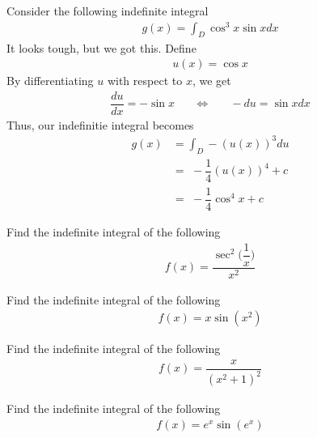 \begin{example}
Consider the following indefinite integral
\begin{align*}
    g(x) = \int_{D} \cos^{3} x \sin x dx
\end{align*}
It looks tough, but we got this. Define
\begin{align*}
    u(x) = \cos x
\end{align*}
By differentiating $u$ with respect to $x$, we get
\begin{align*}
    \dfrac{du}{dx} = -\sin x \hspace{20pt} \Longleftrightarrow \hspace{20pt} -du = \sin x dx
\end{align*}
Thus, our indefinitie integral becomes
\begin{align*}
    g(x) &= \int_{D} -(u(x))^{3} du\\[2ex]
    &= \hspace{4pt} -\dfrac{1}{4} (u(x))^{4} + c\\[2ex]
    &= \hspace{4pt} -\dfrac{1}{4} \cos^{4} x + c
\end{align*}
\end{example}

\begin{exercise}
Find the indefinite integral of the following 
\begin{align*}
    f(x) = \dfrac{\sec^{2} \Big(\dfrac{1}{x}\Big)}{x^{2}}
\end{align*}
\end{exercise}

\begin{exercise}
Find the indefinite integral of the following 
\begin{align*}
    f(x) = x \sin(x^{2})
\end{align*}
\end{exercise}

\begin{exercise}
Find the indefinite integral of the following 
\begin{align*}
    f(x) = \dfrac{x}{(x^{2} + 1)^{2}}
\end{align*}
\end{exercise}

\begin{exercise}
Find the indefinite integral of the following 
\begin{align*}
    f(x) = e^{x} \sin (e^{x})
\end{align*}
\end{exercise}


